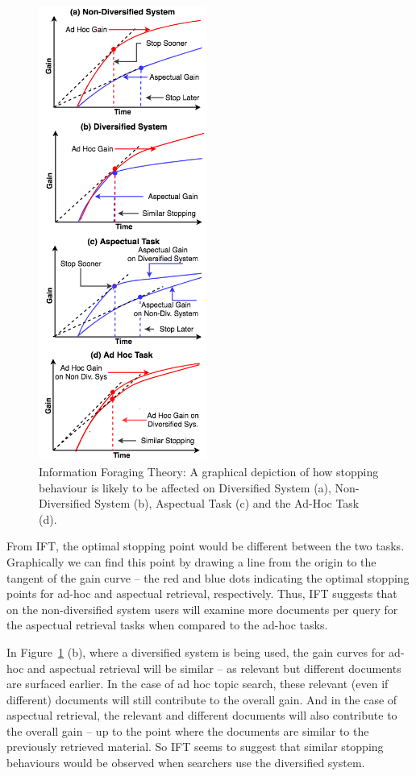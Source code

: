 \begin{figure}[h]
\begin{center}
        \includegraphics[width=55mm]{figures/ift-non-div.png}
        \vspace{-2mm}
    \caption{Information Foraging Theory: A graphical depiction of how stopping behaviour is likely to be affected on Diversified System (a), Non-Diversified System (b), Aspectual Task (c) and the Ad-Hoc Task (d).} \label{fig_ift_patches}    
    \vspace{-6mm}
\end{center}
\end{figure}


From IFT, the optimal stopping point would be different between the two tasks. Graphically we can find this point by drawing a line from the origin to the tangent of the gain curve -- the red and blue dots indicating the optimal stopping points for ad-hoc and aspectual retrieval, respectively. Thus, IFT suggests that on the non-diversified system users will examine more documents per query for the aspectual retrieval tasks when compared to the ad-hoc tasks.

In Figure~\ref{fig_ift_patches} (b), where a diversified system is being used, the gain curves for ad-hoc and aspectual retrieval will be similar -- as relevant but different documents are surfaced earlier. In the case of ad hoc topic search, these relevant (even if different) documents will still contribute to the overall gain. And in the case of aspectual retrieval, the relevant and different documents will also contribute to the overall gain -- up to the point where the documents are similar to the previously retrieved material. So IFT seems to suggest that similar stopping behaviours would be observed when searchers use the diversified system. 

